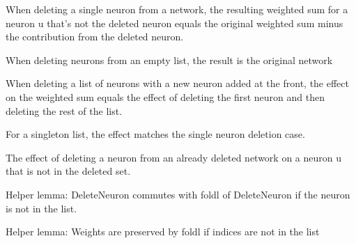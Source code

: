 \begin{lemma}\label{delete_single_neuron_step}
\leanok
When deleting a single neuron from a network, the resulting weighted sum for a neuron u
that's not the deleted neuron equals the original weighted sum minus the contribution
from the deleted neuron.
\end{lemma}

\begin{definition}\label{delete_empty_neurons_step}
\leanok
When deleting neurons from an empty list, the result is the original network
\end{definition}

\begin{definition}\label{delete_cons_neuron_step}
\leanok
When deleting a list of neurons with a new neuron added at the front, the effect 
on the weighted sum equals the effect of deleting the first neuron and then 
deleting the rest of the list.
\end{definition}

\begin{definition}\label{delete_singleton_neuron_step}
For a singleton list, the effect matches the single neuron deletion case.
\leanok
\end{definition}

\begin{definition}\label{delete_neuron_from_deleted_network}
\leanok
The effect of deleting a neuron from an already deleted network on a neuron u that
is not in the deleted set.
\end{definition}

\begin{definition}\label{commute_delete_foldl}
\leanok
Helper lemma: DeleteNeuron commutes with foldl of DeleteNeuron if the neuron is not in the list.
\end{definition}


\begin{definition}\label{foldl_delete_preserves_weights}
\leanok
Helper lemma: Weights are preserved by foldl if indices are not in the list
\end{definition}

